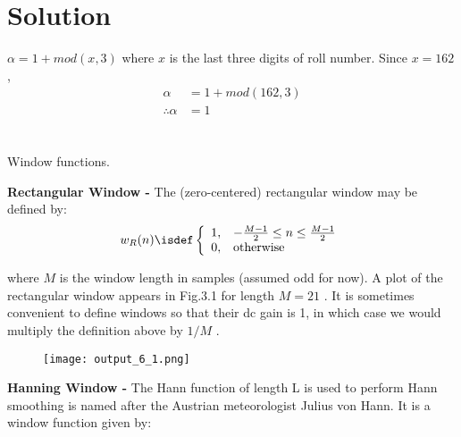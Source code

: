 \documentclass[12pt, a4 paper]{article}
\begin{document}







\section{Solution}
\label{sec:some_label}

 $\alpha = 1 + mod(x, 3)$ where $x$ is the last three digits of roll number. Since $x = 162$,
\begin{equation*}
 \begin{split}
     \alpha &= 1 + mod(162, 3)\\
     \therefore \alpha &= 1\\
 \end{split}
\end{equation*}

\\

 Window functions.
\solution

\textbf{Rectangular Window - }The (zero-centered) rectangular window may be defined by:
$$\displaystyle w_R(n) \isdef \left\{ \begin{array}{ll} 1, & -\frac{M-1}{2} \leq n \leq \frac{M-1}{2} \\ 0, & \mbox{otherwise} \\ \end{array} \right.$$

where $ M$ is the window length in samples (assumed odd for now). A plot of the rectangular window appears in Fig.3.1 for length $ M=21$ . It is sometimes convenient to define windows so that their dc gain is 1, in which case we would multiply the definition above by $ 1/M$ .

\begin{center}
    \begin{wrapfigure}
    \centering
    \texttt{[image: output\_6\_1.png]}
    \end{wrapfigure}
\end{center}

\textbf{Hanning Window - }The Hann function of length L is used to perform Hann smoothing is named after the Austrian meteorologist Julius von Hann. It is a window function given by:
\end{document}
